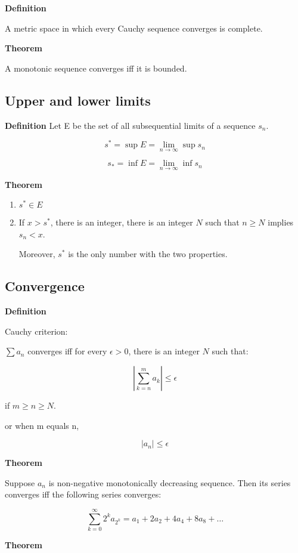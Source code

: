 \documentclass[11pt]{article}
\begin{document}
\textbf{Definition}

A metric space in which every Cauchy sequence converges is complete.

\textbf{Theorem}

A monotonic sequence converges iff it is bounded.

\subsection{Upper and lower limits}
\label{sec:orgad93890}

\textbf{Definition}
Let E be the set of all subsequential limits of a sequence \(s_n\).

\[
s^* = \sup E = \lim_{n\to\infty} \sup s_n
\]

\[
s_* = \inf E = \lim_{n\to\infty} \inf s_n
\]

\textbf{Theorem}

\begin{enumerate}
\item \(s^* \in E\)
\item If \(x > s^*\), there is an integer, there is an integer \(N\) such that \(n \geq N\) implies \(s_n < x\).

Moreover, \(s^*\) is the only number with the two properties.
\end{enumerate}

\subsection{Convergence}
\label{sec:orge0b964c}

\textbf{Definition}

Cauchy criterion:

\(\sum a_n\) converges iff for every \(\epsilon > 0\), there is an integer \(N\) such that:

\[
\left\vert \sum_{k=n}^m a_k \right\vert \leq \epsilon
\]

if \(m \geq n \geq N\).

or when m equals n,

\[
\vert a_n \vert \leq \epsilon
\]


\textbf{Theorem}

Suppose \(a_n\) is non-negative monotonically decreasing sequence. Then its series converges iff the following series converges:

\[
\sum_{k=0}^\infty 2^ka_{2^k} = a_1 + 2a_2 + 4a_4 + 8a_8 + \ldots
\]

\textbf{Theorem}
\end{document}
